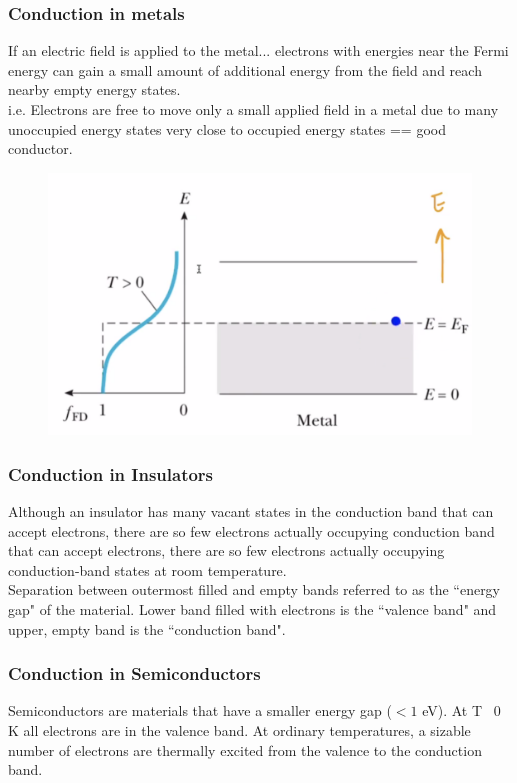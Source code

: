 \documentclass[class=article,crop=false]{standalone}
\begin{document}
\subsubsection{Conduction in metals}
If an electric field is applied to the metal... electrons with energies near the Fermi energy can gain a small amount of additional energy from the field and reach nearby empty energy states. \\

i.e. Electrons are free to move only a small applied field in a metal due to many unoccupied energy states very close to occupied energy states == good conductor.

\begin{figure}[h!]
	\centering
	\includegraphics[width=.8\linewidth]{./Images/metals.png}
	\caption{}
\end{figure}

\subsubsection{Conduction in Insulators}
Although an insulator has many vacant states in the conduction band that can accept electrons, there are so few electrons actually occupying conduction band that can accept electrons, there are so few electrons actually occupying conduction-band states at room temperature.\\

Separation between outermost filled and empty bands referred to as the ``energy gap" of the material. Lower band filled with electrons is the ``valence band" and upper, empty band is the ``conduction band".

\subsubsection{Conduction in Semiconductors}
Semiconductors are materials that have a smaller energy gap ($<1$ eV). At T ~0 K all electrons are in the valence band. At ordinary temperatures, a sizable number of electrons are thermally excited from the valence to the conduction band.
\end{document}
